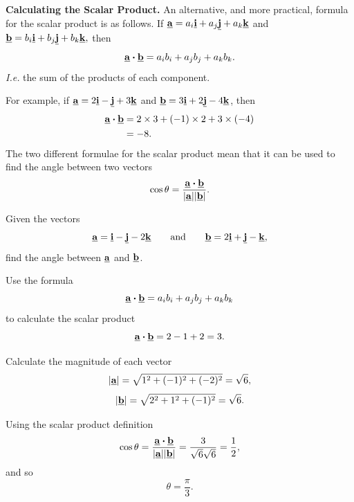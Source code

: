 \textbf{Calculating the Scalar Product.} An alternative, and more practical, formula for the scalar product is as follows. If $\underline{\mathbf{a}}=a_i\underline{\mathbf{i}}+a_j\underline{\mathbf{j}}+a_k\underline{\mathbf{k}}$ and $\underline{\mathbf{b}}=b_i\underline{\mathbf{i}}+b_j\underline{\mathbf{j}}+b_k\underline{\mathbf{k}},$
then
\begin{equation}
    \underline{\mathbf{a}}\boldsymbol{\cdot}\underline{\mathbf{b}}
    =a_ib_i+a_jb_j+a_kb_k.
\end{equation}
\emph{I.e.} the sum of the products of each component.

For example, if $\underline{\mathbf{a}}=2\underline{\mathbf{i}}-\underline{\mathbf{j}}+3\underline{\mathbf{k}}$ and $\underline{\mathbf{b}}=3\underline{\mathbf{i}}+2\underline{\mathbf{j}}-4\underline{\mathbf{k}}$, then
\begin{align*}
    \underline{\mathbf{a}}\boldsymbol{\cdot}\underline{\mathbf{b}} &=2\times3+(-1)\times2+3\times(-4)\\
    &= -8.
\end{align*}
The two different formulae for the scalar product mean that it can be used to find the angle between two vectors
\begin{equation}
    \cos\theta =\frac{\underline{\mathbf{a}}\boldsymbol{\cdot}\underline{\mathbf{b}}}
{\lvert\underline{\mathbf{a}}\rvert\lvert\underline{\mathbf{b}}\rvert}.
\end{equation}

\begin{example}[DIY]
Given the vectors
\[
\underline{\mathbf{a}}=\underline{\mathbf{i}}-\underline{\mathbf{j}}-2\underline{\mathbf{k}}
\qquad\text{and}\qquad
\underline{\mathbf{b}}=2\underline{\mathbf{i}}+\underline{\mathbf{j}}-\underline{\mathbf{k}},
\]
find the angle between $\underline{\mathbf{a}}$ and $\underline{\mathbf{b}}$.
\end{example}

\begin{blanksol}
Use the formula
\[
\underline{\mathbf{a}}\boldsymbol{\cdot}\underline{\mathbf{b}}
=a_ib_i+a_jb_j+a_kb_k
\]
to calculate the scalar product
\[
\underline{\mathbf{a}}\boldsymbol{\cdot}\underline{\mathbf{b}}=2-1+2=3.
\]

Calculate the magnitude of each vector
\[
\lvert\underline{\mathbf{a}}\rvert
=\sqrt{1^2+(-1)^2+(-2)^2}=\sqrt{6},
\]
\[
\lvert\underline{\mathbf{b}}\rvert
=\sqrt{2^2+1^2+(-1)^2}=\sqrt{6}.
\]

Using the scalar product definition
\[
\cos\theta
=\frac{\underline{\mathbf{a}}\boldsymbol{\cdot}\underline{\mathbf{b}}}
{\lvert\underline{\mathbf{a}}\rvert\lvert\underline{\mathbf{b}}\rvert}
=\frac{3}{\sqrt{6}\sqrt{6}}
=\frac{1}{2},
\]
and so
\[
\theta=\frac{\pi}{3}.
\]
\end{blanksol}

